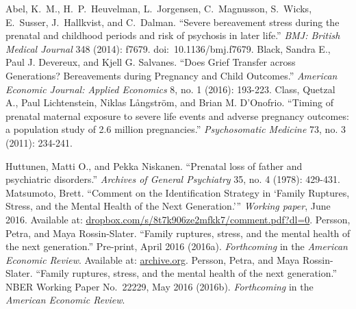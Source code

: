\documentclass[a4paper,12pt]{article}
\begin{document}
\begin{thebibliography}{abbrev}
Abel, K.~M., H.~P.~Heuvelman, L.~Jorgensen, C.~Magnusson, S.~Wicks, E.~Susser, J.~Hallkvist, and C.~Dalman. ``Severe bereavement stress during the prenatal and childhood periods and risk of psychosis in later life.'' \emph{BMJ: British Medical Journal} 348 (2014): f7679. doi:~10.1136/bmj.f7679.
\bibitem{}Black, Sandra E., Paul J. Devereux, and Kjell G. Salvanes. ``Does Grief Transfer across Generations? Bereavements during Pregnancy and Child Outcomes.'' \emph{American Economic Journal: Applied Economics} 8, no. 1 (2016): 193-223.
Class, Quetzal A., Paul Lichtenstein, Niklas Långström, and Brian M. D'Onofrio. ``Timing of prenatal maternal exposure to severe life events and adverse pregnancy outcomes: a population study of 2.6 million pregnancies.'' \emph{Psychosomatic Medicine} 73, no. 3 (2011): 234-241.

Huttunen, Matti O., and Pekka Niskanen. ``Prenatal loss of father and psychiatric disorders.'' \emph{Archives of General Psychiatry} 35, no. 4 (1978): 429-431.
Matsumoto, Brett. ``Comment on the Identification Strategy in `Family Ruptures, Stress, and the Mental Health of the Next Generation.''' \emph{Working paper}, June 2016. Available at: \href{https://www.dropbox.com/s/8t7k906ze2mfkk7/comment.pdf}{dropbox.com/s/8t7k906ze2mfkk7/comment.pdf?dl=0}.
Persson, Petra, and Maya Rossin-Slater. ``Family ruptures, stress, and the mental health of the next generation.'' Pre-print, April 2016 (2016a). \emph{Forthcoming} in the \emph{American Economic Review}. Available at: \href{https://web.archive.org/web/20160520143717/http://www.econ.ucsb.edu/~mrossin/Persson_RossinSlater_apr2016.pdf}{archive.org}.
Persson, Petra, and Maya Rossin-Slater. ``Family ruptures, stress, and the mental health of the next generation.'' NBER Working Paper No.~22229, May 2016 (2016b). \emph{Forthcoming} in the \emph{American Economic Review}.
\end{thebibliography}
\end{document}
